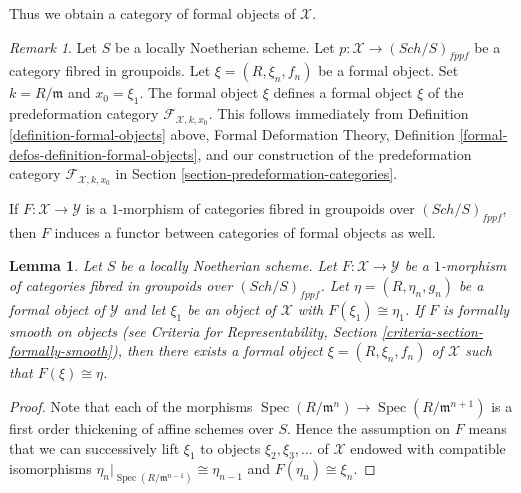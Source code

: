 \documentclass{stacks-project}
\theoremstyle{plain}
\newtheorem{lemma}[subsection]{Lemma}
\theoremstyle{definition}
\theoremstyle{remark}
\newtheorem{remark}[subsection]{Remark}
\numberwithin{equation}{subsection}
\def\Spec{\mathop{\mathrm{Spec}}}
\def\Sch{\mathit{Sch}}
\begin{document}
\noindent
Thus we obtain a category of formal objects of $\mathcal{X}$.

\begin{remark}
\label{remark-formal-objects-match}
Let $S$ be a locally Noetherian scheme. Let
$p : \mathcal{X} \to (\Sch/S)_{fppf}$ be a category fibred in groupoids.
Let $\xi = (R, \xi_n, f_n)$ be a formal object. Set $k = R/\mathfrak m$ and
$x_0 = \xi_1$. The formal object $\xi$ defines a formal object
$\xi$ of the predeformation category $\mathcal{F}_{\mathcal{X}, k, x_0}$.
This follows immediately from
Definition \ref{definition-formal-objects} above,
Formal Deformation Theory, Definition
\ref{formal-defos-definition-formal-objects},
and our construction of the predeformation category
$\mathcal{F}_{\mathcal{X}, k, x_0}$ in
Section \ref{section-predeformation-categories}.
\end{remark}

\noindent
If $F : \mathcal{X} \to \mathcal{Y}$ is a $1$-morphism of categories fibred
in groupoids over $(\Sch/S)_{fppf}$, then $F$ induces a functor between
categories of formal objects as well.

\begin{lemma}
\label{lemma-smooth-lift-formal}
Let $S$ be a locally Noetherian scheme. Let $F : \mathcal{X} \to \mathcal{Y}$
be a $1$-morphism of categories fibred in groupoids over $(\Sch/S)_{fppf}$.
Let $\eta = (R, \eta_n, g_n)$ be a formal object of $\mathcal{Y}$
and let $\xi_1$ be an object of $\mathcal{X}$ with $F(\xi_1) \cong \eta_1$.
If $F$ is formally smooth on objects (see
Criteria for Representability, Section \ref{criteria-section-formally-smooth}),
then there exists a formal object $\xi = (R, \xi_n, f_n)$ of $\mathcal{X}$
such that $F(\xi) \cong \eta$.
\end{lemma}

\begin{proof}
Note that each of the morphisms
$\Spec(R/\mathfrak m^n) \to \Spec(R/\mathfrak m^{n + 1})$ is a first order
thickening of affine schemes over $S$. Hence the assumption on $F$ means
that we can successively lift $\xi_1$ to objects $\xi_2, \xi_3, \ldots$
of $\mathcal{X}$ endowed with compatible isomorphisms
$\eta_n|_{\Spec(R/\mathfrak m^{n - 1})} \cong \eta_{n - 1}$
and $F(\eta_n) \cong \xi_n$.
\end{proof}
\end{document}
